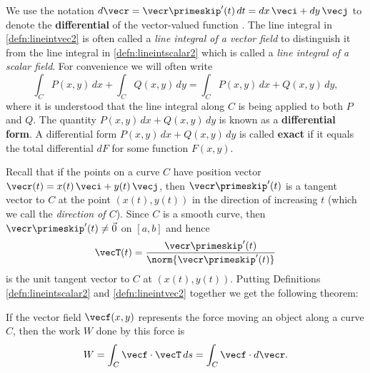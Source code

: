 We use the notation $d\vecr = \vecr\primeskip'(t)\,dt = dx\,\veci + dy\,\vecj$ to denote the \textbf{differential} of the vector-valued function \vecr. The line integral in \autoref{defn:lineintvec2} is often called a \emph{line integral of a vector field} to distinguish it from the line integral in \autoref{defn:lineintscalar2} which is called a \emph{line integral of a scalar field}. For convenience we will often write
\[\int_C P(x,y)\,dx + \int_C Q(x,y)\,dy = \int_C P(x,y)\,dx + Q(x,y)\,dy ,\]
where it is understood that the line integral along $C$ is being applied to both $P$ and $Q$. The quantity $P(x,y)\,dx + Q(x,y)\,dy$ is known as a \textbf{differential form}.
A differential form $P(x,y)\,dx + Q(x,y)\,dy$ is called \textbf{exact} if it equals the total differential $dF$ for some function $F(x,y)$.

Recall that if the points on a curve $C$ have position vector $\vecr(t) = x(t)\,\veci + y(t)\,\vecj$, then $\vecr\primeskip'(t)$ is a tangent vector to $C$ at the point $(x(t),y(t))$ in the direction of increasing $t$ (which we call the \emph{direction of $C$}). Since $C$ is a smooth curve, then $\vecr\primeskip'(t) \ne \vec0$ on $[a,b]$ and hence
\[\vecT(t) = \frac{\vecr\primeskip'(t)}{\norm{\vecr\primeskip'(t)}}\]
is the unit tangent vector to $C$ at $(x(t),y(t))$. Putting Definitions \ref{defn:lineintscalar2} and \ref{defn:lineintvec2} together we get the following theorem:


If the vector field $\vecf(x,y)$ represents the force moving an object along a curve $C$, then the work $W$ done by this force is
\[
 W = \int_C \vecf\cdot\vecT\,ds
 = \int_C \vecf\cdot d\vecr .
\]

